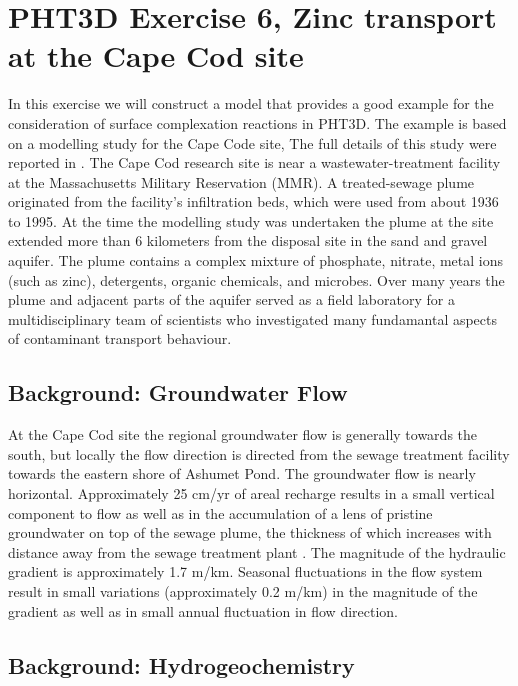 \section[PHT3D Exercise 6, Zinc transport at the Cape Cod site]{PHT3D Exercise 6, Zinc transport at the Cape Cod site}

In this exercise we will construct a model that provides 
a good example for the consideration of surface complexation reactions in PHT3D.
The example is based on a modelling study for the Cape Code site, 
The full details of this study were reported in \cite{Kent20003411}.    
The Cape Cod research site is near a wastewater-treatment facility at 
the Massachusetts Military Reservation (MMR). A treated-sewage plume originated 
from the facility's infiltration beds, which were used from about 1936 to 1995. 
At the time the modelling study was undertaken the plume at the site extended 
more than 6 kilometers from the disposal site in the 
sand and gravel aquifer. The plume contains a complex mixture of phosphate, nitrate, 
metal ions (such as zinc), detergents, organic chemicals, and microbes. 
Over many years the plume and adjacent parts of the aquifer  
served as a field laboratory for a multidisciplinary team of scientists 
who investigated many fundamantal aspects 
of contaminant transport behaviour.

\subsection{Background: Groundwater Flow}

At the Cape Cod site the regional groundwater flow is generally towards 
the south, but locally the flow direction is directed from the 
sewage treatment facility towards the eastern shore of Ashumet Pond.  
The groundwater flow is nearly horizontal.
Approximately 25 cm/yr of areal recharge results
in a small vertical component to flow as well as
in the accumulation of a lens of pristine groundwater on top of 
the sewage plume, the thickness of which increases with 
distance away from the sewage 
treatment plant \citep[]{Leblanc1984,Leblanc1991895}.  
The magnitude of the hydraulic gradient 
is approximately 1.7 m/km. 
Seasonal fluctuations in the flow system result in small 
variations (approximately 0.2 m/km) in the magnitude
of the gradient as well as in small annual fluctuation 
in flow direction.

\subsection{Background: Hydrogeochemistry}

